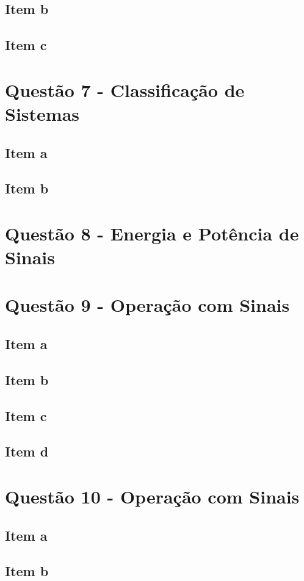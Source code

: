 \documentclass[a4paper, 12pt]{article}
\begin{document}
        \subsection{Item b}
        \subsection{Item c}
    \section{Quest\~{a}o 7 - Classificação de Sistemas}
        \subsection{Item a}
        \subsection{Item b}
    \section{Quest\~{a}o 8 - Energia e Potência de Sinais}
    \section{Quest\~{a}o 9 - Operação com Sinais}
        \subsection{Item a}
        \subsection{Item b}
        \subsection{Item c}
        \subsection{Item d}
    \section{Quest\~{a}o 10 - Operação com Sinais}
        \subsection{Item a}
        \subsection{Item b}
\end{document}
